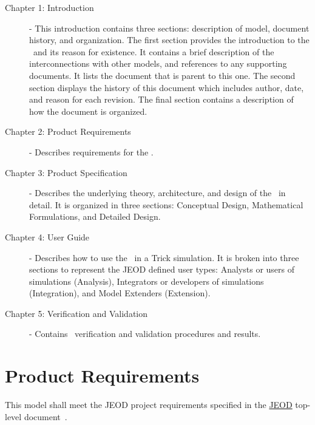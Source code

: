 \begin{description}

\item[Chapter 1: Introduction] - 
This introduction contains three sections: description of model, document history, and organization.  
The first section provides the introduction to the \MessageHandlerDesc\ and its reason 
for existence.  It contains a brief description of the interconnections with other models, and 
references to any supporting documents. It lists the document that is parent to this one.
The second section displays the history of this document which includes
author, date, and reason for each revision.  The final
section contains a description of how the document is organized.

\item[Chapter 2: Product Requirements] - 
Describes requirements for the \MessageHandlerDesc.

\item[Chapter 3: Product Specification] - 
Describes the underlying theory, architecture, and design of the \MessageHandlerDesc\ in detail.  It is organized in 
three sections: Conceptual Design, Mathematical Formulations, and Detailed Design.

\item[Chapter 4: User Guide] - 
Describes how to use the \MessageHandlerDesc\ in a Trick simulation.  It is broken into three sections to represent the JEOD 
defined user types: Analysts or users of simulations (Analysis), Integrators or developers of simulations (Integration),
and Model Extenders (Extension).

\item[Chapter 5: Verification and Validation] -  
Contains \MessageHandlerDesc\ verification and validation procedures and results.

\end{description}

\chapter{Product Requirements}\label{ch:reqt}
This model shall meet the JEOD project requirements specified in the 
\hyperref{file:\JEODHOME/docs/JEOD.pdf}{part1}{reqt}{JEOD} top-level document~\cite{dynenv:JEOD}.

%
%      
%   
%
%

